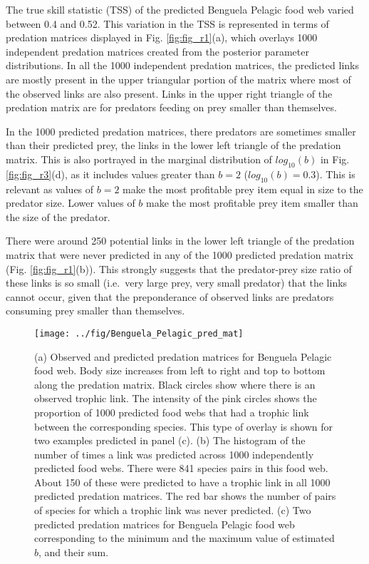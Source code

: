 \documentclass{article}
\begin{document}
The true skill statistic (TSS) of the predicted Benguela Pelagic food
web varied between 0.4 and 0.52. This variation in the TSS is
represented in terms of predation matrices displayed in Fig.
\ref{fig:fig_r1}(a), which overlays 1000 independent predation matrices
created from the posterior parameter distributions. In all the 1000
independent predation matrices, the predicted links are mostly present
in the upper triangular portion of the matrix where most of the observed
links are also present. Links in the upper right triangle of the
predation matrix are for predators feeding on prey smaller than
themselves.

In the 1000 predicted predation matrices, there predators are sometimes
smaller than their predicted prey, the links in the lower left triangle
of the predation matrix. This is also portrayed in the marginal
distribution of \(log_{10}(b)\) in Fig. \ref{fig:fig_r3}(d), as it
includes values greater than \(b=2\) (\(log_{10}(b)=0.3\)). This is
relevant as values of \(b=2\) make the most profitable prey item equal
in size to the predator size. Lower values of \(b\) make the most
profitable prey item smaller than the size of the predator.

There were around 250 potential links in the lower left triangle of the
predation matrix that were never predicted in any of the 1000 predicted
predation matrix (Fig. \ref{fig:fig_r1}(b)). This strongly suggests that
the predator-prey size ratio of these links is so small (i.e.~very large
prey, very small predator) that the links cannot occur, given that the
preponderance of observed links are predators consuming prey smaller
than themselves.

\begin{figure}

{\centering \texttt{[image: ../fig/Benguela\_Pelagic\_pred\_mat]} 

}

\caption{\label{fig:fig_r1} (a) Observed and predicted predation matrices for Benguela Pelagic food web. Body size increases from left to right and top to bottom along the predation matrix. Black circles show where there is an observed trophic link. The intensity of the pink circles shows the proportion of 1000 predicted food webs that had a trophic link between the corresponding species. This type of overlay is shown for two examples predicted in panel (c). (b) The histogram of the number of times a link was predicted across 1000 independently predicted food webs. There were 841 species pairs in this food web. About 150 of these were predicted to have a trophic link in all 1000 predicted predation matrices. The red bar shows the number of pairs of species for which a trophic link was never predicted. (c) Two predicted predation matrices for Benguela Pelagic food web corresponding to the minimum and the maximum value of estimated $b$, and their sum.}\label{fig:unnamed-chunk-5}
\end{figure}
\end{document}
